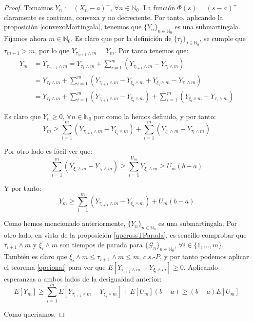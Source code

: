 \begin{proof}

Tomamos $Y_n := (X_n-a)^+$, $\forall n\in\mathds{N}_0$. La función $\Phi(s)=(s-a)^+$ claramente es continua, convexa y no decreciente. Por tanto, aplicando la proposición \ref{convexoMartingala}, tenemos que $\{Y_n\}_{n\in\mathds{N}_0}$ es una submartingala. Fijamos ahora $m\in\mathds{N}_0$. Es claro que por la definición de $\{\tau _j\}_{j\in \mathds{N}_0}$, se cumple que $\tau _{m+1}>m$, por lo que $Y_{\tau_{m+1}\wedge m}=Y_m$. Por tanto tenemos que:
\begin{align*}
Y_m &=Y_{\tau_{m+1}\wedge m}=Y_{\tau_{1}\wedge m}+\sum_{i=1}^m(Y_{\tau_{i+1}\wedge m}-Y_{\tau_{i}\wedge m})\\
&= Y_{\tau_{1}\wedge m}+\sum_{i=1}^m(Y_{\tau_{i+1}\wedge m}-Y_{\xi_i\wedge m} +Y_{\xi_i\wedge m} -Y_{\tau_{i}\wedge m})\\
&= Y_{\tau_{1}\wedge m}+\sum_{i=1}^m(Y_{\tau_{i+1}\wedge m}-Y_{\xi_i\wedge m}) +\sum_{i=1}^m (Y_{\xi_i\wedge m} -Y_{\tau_{i}\wedge m})
\end{align*}

Es claro que $Y_n\geq 0$, $\forall n\in \mathds{N}_0$ por como la hemos definido, y por tanto:
$$Y_m \geq \sum_{i=1}^m(Y_{\tau_{i+1}\wedge m}-Y_{\xi_i\wedge m}) +\sum_{i=1}^m (Y_{\xi_i\wedge m} -Y_{\tau_{i}\wedge m})$$

Por otro lado es fácil ver que:
$$\sum_{i=1}^m (Y_{\xi_i\wedge m} -Y_{\tau_{i}\wedge m}) \geq \sum_{i=1}^{U_m} Y_{\xi_i\wedge m}\geq U_m (b-a)$$

Y por tanto:
$$Y_m \geq \sum_{i=1}^m(Y_{\tau_{i+1}\wedge m}-Y_{\xi_i\wedge m}) + U_m (b-a)$$

Como hemos mencionado anteriormente, $\{Y_n\}_{n\in\mathds{N}_0}$ es una submartingala. Por otro lado, en vista de la proposición \ref{upcrossTParada}, es sencillo comprobar que $\tau_{i+1}\wedge m$ y $\xi_{i} \wedge m$ son tiempos de parada para $\{\mathscr{G}_n\}_{n\in \mathds{N}_0}$, $\forall i\in \{1,\ldots ,m\}$. También es claro que $\xi_{i} \wedge m\leq \tau_{i+1}\wedge m \leq m$, $c.s.\text{-}P$, y por tanto podemos aplicar el teorema \ref{opcional} para ver que $E[Y_{\tau_{i+1}\wedge m}-Y_{\xi_{i} \wedge m}]\geq 0$. Aplicando esperanzas a ambos lados de la desigualdad anterior:
$$E[Y_m] \geq \sum_{i=1}^mE[Y_{\tau_{i+1}\wedge m}-Y_{\xi_i\wedge m}] + E[U_m](b-a) \geq (b-a)E[U_m]$$

Como queríamos.

\end{proof}

